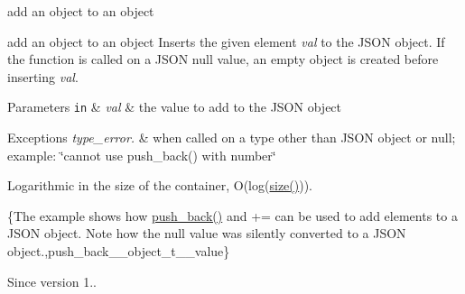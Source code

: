 add an object to an object 

add an object to an object Inserts the given element {\itshape val} to the J\+S\+ON object. If the function is called on a J\+S\+ON null value, an empty object is created before inserting {\itshape val}.


\begin{DoxyParams}[1]{Parameters}
\mbox{\tt in}  & {\em val} & the value to add to the J\+S\+ON object\\
\hline
\end{DoxyParams}

\begin{DoxyExceptions}{Exceptions}
{\em type\+\_\+error.} & when called on a type other than J\+S\+ON object or null; example\+: {\ttfamily \char`\"{}cannot use push\+\_\+back() with number\char`\"{}}\\
\hline
\end{DoxyExceptions}
Logarithmic in the size of the container, O(log({\ttfamily \hyperlink{classnlohmann_1_1basic__json_a25e27ad0c6d53c01871c5485e1f75b96}{size()}})).

\{The example shows how {\ttfamily \hyperlink{classnlohmann_1_1basic__json_ac8e523ddc8c2dd7e5d2daf0d49a9c0d7}{push\+\_\+back()}} and {\ttfamily +=} can be used to add elements to a J\+S\+ON object. Note how the {\ttfamily null} value was silently converted to a J\+S\+ON object.,push\+\_\+back\+\_\+\+\_\+object\+\_\+t\+\_\+\+\_\+value\}

\begin{DoxySince}{Since}
version 1.. 
\end{DoxySince}
